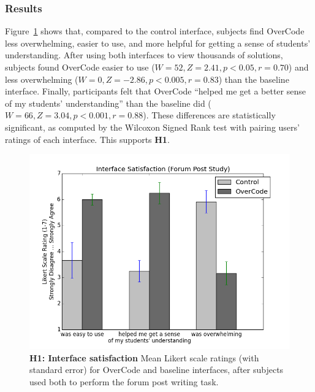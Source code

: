 \subsubsection{Results}
Figure~\ref{study1Likert} shows that, compared to the control interface, subjects find OverCode less overwhelming, easier to use, and more helpful for getting a sense of students' understanding. After using both interfaces to view thousands of solutions, subjects found OverCode easier to use ($W=52, Z=2.41, p<0.05, r=0.70$) and less overwhelming ($W=0, Z=-2.86, p<0.005, r=0.83$) than the baseline interface. Finally, participants felt that OverCode ``helped me get a better sense of my students' understanding'' than the baseline did ($W=66, Z=3.04, p<0.001, r=0.88$). These differences are statistically significant, as computed by the Wilcoxon Signed Rank test with pairing users' ratings of each interface. This supports \textbf{H1}.

\begin{figure}
\centering
\includegraphics[scale=0.5]{Body/figures/overcode/study1Likert.png}
\caption{{\bf H1: Interface satisfaction} Mean Likert scale ratings (with standard error) for OverCode and baseline interfaces, after subjects used both to perform the forum post writing task.}
\label{study1Likert}
\end{figure}


